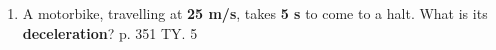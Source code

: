 \documentclass[A4,12pt]{article}
\begin{document}
\begin{enumerate}[label=\bfseries (\arabic*)]
\item A motorbike, travelling at \textbf{25 m/s}, takes \textbf{5 s} to come to a halt. What is its 
\textbf{deceleration}? \cite{CCEADA} p. 351 TY. 5
%
%















\end{enumerate}
\end{document}

